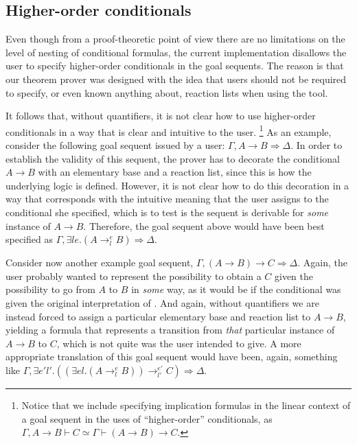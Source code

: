\subsection{Higher-order conditionals}

Even though from a proof-theoretic point of view there are no limitations on the
level of nesting of conditional formulas, the current implementation disallows
the user to specify higher-order conditionals in the goal sequents.  The reason
is that our theorem prover was designed with the idea that users should not be
required to specify, or even known anything about, reaction lists when using the
tool.

It follows that, without quantifiers, it is not clear how to use higher-order
conditionals in a way that is clear and intuitive to the user.
\footnote{Notice that we include specifying implication formulas in the linear
  context of a goal sequent in the uses of ``higher-order'' conditionals, as
  $\Gamma, A \rightarrow B \vdash C \simeq \Gamma \vdash (A \rightarrow B)
  \rightarrow C$.}
As an example, consider the following goal sequent issued by a user: $\Gamma, A
\rightarrow B \Longrightarrow \Delta$. In order to establish the validity of
this sequent, the prover has to decorate the conditional $A \rightarrow B$ with
an elementary base and a reaction list, since this is how the underlying logic
is defined. However, it is not clear how to do this decoration in a way that
corresponds with the intuitive meaning that the user assigns to the
conditional she specified, which is to test is the sequent is derivable
for \emph{some} instance of $A \rightarrow B$.
Therefore, the goal sequent above would have been best specified as
$\Gamma, \exists l e . (A \rightarrow_l^e B) \Longrightarrow \Delta$.

Consider now another example goal sequent,
$\Gamma, (A \rightarrow B) \rightarrow C \Longrightarrow \Delta$.
Again, the user probably wanted to represent the possibility to obtain a $C$
given the possibility to go from $A$ to $B$ in \emph{some} way, as it would be
if the conditional was given the original interpretation of \cite{adding-logic}.
And again, without quantifiers we are instead forced to assign a particular
elementary base and reaction list to $A \rightarrow B$, yielding a formula that
represents a transition from \emph{that} particular instance of $A \rightarrow
B$ to $C$, which is not quite was the user intended to give.
A more appropriate translation of this goal sequent would have been, again,
something like
$\Gamma, \exists e' l' . ((\exists e l . (A \rightarrow_l^e B)) \rightarrow_{l'}^{e'} C) \Longrightarrow \Delta$.

